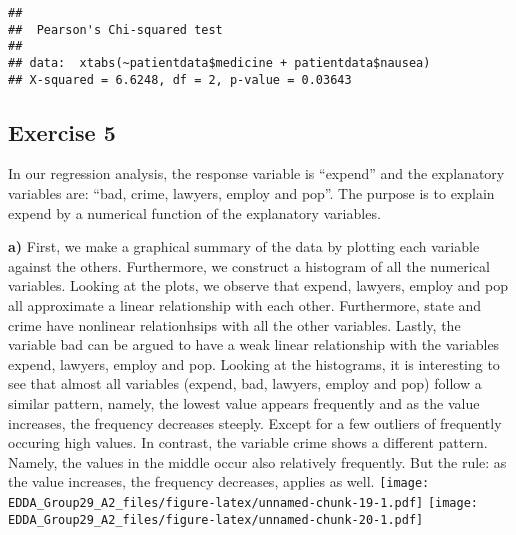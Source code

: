 \documentclass[]{article}
\begin{document}
\begin{verbatim}
## 
##  Pearson's Chi-squared test
## 
## data:  xtabs(~patientdata$medicine + patientdata$nausea)
## X-squared = 6.6248, df = 2, p-value = 0.03643
\end{verbatim}

\hypertarget{exercise-5}{%
\subsection{Exercise 5}\label{exercise-5}}

In our regression analysis, the response variable is ``expend'' and the
explanatory variables are: ``bad, crime, lawyers, employ and pop''. The
purpose is to explain expend by a numerical function of the explanatory
variables.

\textbf{a)} First, we make a graphical summary of the data by plotting
each variable against the others. Furthermore, we construct a histogram
of all the numerical variables. Looking at the plots, we observe that
expend, lawyers, employ and pop all approximate a linear relationship
with each other. Furthermore, state and crime have nonlinear
relationhsips with all the other variables. Lastly, the variable bad can
be argued to have a weak linear relationship with the variables expend,
lawyers, employ and pop. Looking at the histograms, it is interesting to
see that almost all variables (expend, bad, lawyers, employ and pop)
follow a similar pattern, namely, the lowest value appears frequently
and as the value increases, the frequency decreases steeply. Except for
a few outliers of frequently occuring high values. In contrast, the
variable crime shows a different pattern. Namely, the values in the
middle occur also relatively frequently. But the rule: as the value
increases, the frequency decreases, applies as well.
\texttt{[image: EDDA\_Group29\_A2\_files/figure-latex/unnamed-chunk-19-1.pdf]}
\texttt{[image: EDDA\_Group29\_A2\_files/figure-latex/unnamed-chunk-20-1.pdf]}
\end{document}
